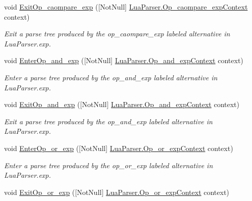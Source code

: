 \begin{DoxyCompactItemize}
void \mbox{\hyperlink{interfacezlua_1_1_i_lua_listener_a9ad347c8ee340aeff0c0f8bb311cae0a}{Exit\+Op\+\_\+caompare\+\_\+exp}} (\mbox{[}Not\+Null\mbox{]} \mbox{\hyperlink{classzlua_1_1_lua_parser_1_1_op__caompare__exp_context}{Lua\+Parser.\+Op\+\_\+caompare\+\_\+exp\+Context}} context)
\begin{DoxyCompactList}\small\item\em Exit a parse tree produced by the {\ttfamily op\+\_\+caompare\+\_\+exp} labeled alternative in Lua\+Parser.\+exp. \end{DoxyCompactList}\item 
void \mbox{\hyperlink{interfacezlua_1_1_i_lua_listener_a12bd95b1347e95dcdcdc7d2fdc22558b}{Enter\+Op\+\_\+and\+\_\+exp}} (\mbox{[}Not\+Null\mbox{]} \mbox{\hyperlink{classzlua_1_1_lua_parser_1_1_op__and__exp_context}{Lua\+Parser.\+Op\+\_\+and\+\_\+exp\+Context}} context)
\begin{DoxyCompactList}\small\item\em Enter a parse tree produced by the {\ttfamily op\+\_\+and\+\_\+exp} labeled alternative in Lua\+Parser.\+exp. \end{DoxyCompactList}\item 
void \mbox{\hyperlink{interfacezlua_1_1_i_lua_listener_a87ea223ce3d022a98247e31bcdd4490d}{Exit\+Op\+\_\+and\+\_\+exp}} (\mbox{[}Not\+Null\mbox{]} \mbox{\hyperlink{classzlua_1_1_lua_parser_1_1_op__and__exp_context}{Lua\+Parser.\+Op\+\_\+and\+\_\+exp\+Context}} context)
\begin{DoxyCompactList}\small\item\em Exit a parse tree produced by the {\ttfamily op\+\_\+and\+\_\+exp} labeled alternative in Lua\+Parser.\+exp. \end{DoxyCompactList}\item 
void \mbox{\hyperlink{interfacezlua_1_1_i_lua_listener_a51c92b24a1ae3217599c08d098f351e8}{Enter\+Op\+\_\+or\+\_\+exp}} (\mbox{[}Not\+Null\mbox{]} \mbox{\hyperlink{classzlua_1_1_lua_parser_1_1_op__or__exp_context}{Lua\+Parser.\+Op\+\_\+or\+\_\+exp\+Context}} context)
\begin{DoxyCompactList}\small\item\em Enter a parse tree produced by the {\ttfamily op\+\_\+or\+\_\+exp} labeled alternative in Lua\+Parser.\+exp. \end{DoxyCompactList}\item 
void \mbox{\hyperlink{interfacezlua_1_1_i_lua_listener_acd1c99a866862f8c938fd314f3859852}{Exit\+Op\+\_\+or\+\_\+exp}} (\mbox{[}Not\+Null\mbox{]} \mbox{\hyperlink{classzlua_1_1_lua_parser_1_1_op__or__exp_context}{Lua\+Parser.\+Op\+\_\+or\+\_\+exp\+Context}} context)

\end{DoxyCompactItemize}
